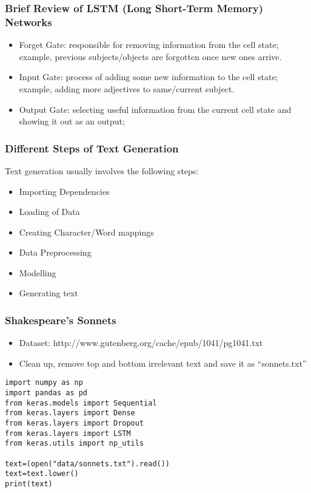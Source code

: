 \begin{frame}[fragile]
  \frametitle{Brief Review of LSTM (Long Short-Term Memory) Networks}

  \begin{itemize}
  \item Forget Gate: responsible for removing information from the cell state; example, previous subjects/objects are forgotten once new ones arrive.
    \item Input Gate: process of adding some new information to the cell state; example, adding more adjectives to same/current subject.
        \item Output Gate: selecting useful information from the current cell state and showing it out as an output;
  	  \end{itemize}
 \end{frame} 
 
\begin{frame}[fragile]
  \frametitle{Different Steps of Text Generation}
Text generation usually involves the following steps:
  \begin{itemize}
  \item Importing Dependencies
  \item Loading of Data
  \item Creating Character/Word mappings
  \item Data Preprocessing
  \item Modelling
  \item Generating text
  	  \end{itemize}
 \end{frame} 
 
 
\begin{frame}[fragile]
  \frametitle{Shakespeare's Sonnets}
  \begin{itemize}
  \item Dataset: http://www.gutenberg.org/cache/epub/1041/pg1041.txt
\item Clean up, remove top and bottom irrelevant text and save it as ``sonnets.txt''
  	  \end{itemize}
\begin{lstlisting}
import numpy as np
import pandas as pd
from keras.models import Sequential
from keras.layers import Dense
from keras.layers import Dropout
from keras.layers import LSTM
from keras.utils import np_utils

text=(open("data/sonnets.txt").read())
text=text.lower()
print(text)
\end{lstlisting}
 \end{frame} 
 
